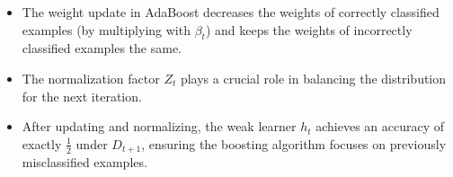 \documentclass{article}
\begin{document}
\begin{itemize}
    \item The weight update in AdaBoost decreases the weights of correctly classified examples (by multiplying with $\beta_t$) and keeps the weights of incorrectly classified examples the same.
    \item The normalization factor $Z_t$ plays a crucial role in balancing the distribution for the next iteration.
    \item After updating and normalizing, the weak learner $h_t$ achieves an accuracy of exactly $\frac{1}{2}$ under $D_{t+1}$, ensuring the boosting algorithm focuses on previously misclassified examples.
\end{itemize}
\end{document}
